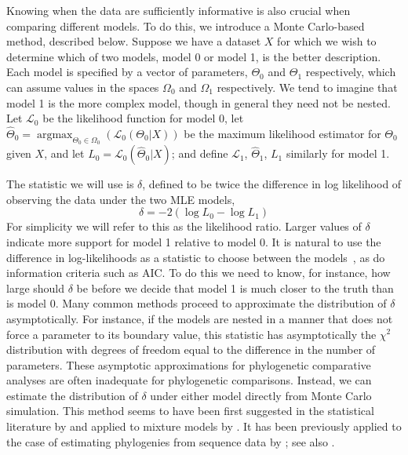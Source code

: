 Knowing when the data are sufficiently informative is also crucial when comparing different models.  
To do this, we introduce a Monte Carlo-based method, described below.
Suppose we have a dataset $X$ for which we wish to determine which of two models, model 0 or model 1, is the better description.  
Each model is specified by a vector of parameters, $\Theta_0$ and $\Theta_1$ respectively, 
which can assume values in the spaces $\Omega_0$ and $\Omega_1$ respectively.  
We tend to imagine that model 1 is the more complex model,
though in general they need not be nested.
Let $\mathcal{L}_0$ be the likelihood function for model 0, 
let $\hat \Theta_0 = \operatorname{argmax}_{\Theta_0 \in \Omega_0}(\mathcal{L}_0(\Theta_0|X))$ 
be the maximum likelihood estimator for $\Theta_0$ given $X$, 
and let $L_0 = \mathcal{L}_0 (\hat \Theta_0 | X)$; 
and define $\mathcal{L}_1$, $\hat \Theta_1$, $L_1$ similarly for model 1.

The statistic we will use is $\delta$, 
defined to be twice the difference in log likelihood of observing the data under the two MLE models, %
\begin{equation}
\delta = - 2\left( \log L_0 - \log L_1 \right)
\label{delta}
\end{equation}
For simplicity we will refer to this as the likelihood ratio. 
Larger values of $\delta$ indicate more support for model 1 relative to model 0. 
It is natural to use the difference in log-likelihoods as a statistic to choose between the models~\citep{Neyman1933},
as do information criteria such as AIC.
To do this we need to know, for instance, how large should $\delta$ be before we decide that model 1 is much closer to the truth than is model 0.
Many common methods proceed to approximate the distribution of $\delta$ asymptotically.
For instance, if the models are nested in a manner that does not force a parameter to its boundary value,
this statistic has asymptotically the $\chi^2$ distribution with degrees of freedom equal to the difference in the number of parameters.
These asymptotic approximations for phylogenetic comparative analyses are often inadequate for phylogenetic comparisons.  
Instead, we can estimate the distribution of $\delta$ under either model directly from Monte Carlo simulation.  
This method seems to have been first suggested in the statistical literature by \citet{Cox1961, Cox1962} 
and applied to mixture models by \citet{McLachlan1987}.
It has been previously applied to the case of estimating phylogenies from sequence data by \citet{Huelsenbeck1996};
see also \citet{Goldman1993}.  

